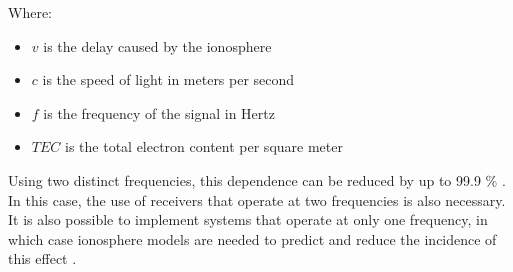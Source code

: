 Where:

\begin{itemize}
    \item $v$ is the delay caused by the ionosphere
    \item $c$ is the speed of light in meters per second
    \item $f$ is the frequency of the signal in Hertz
    \item $TEC$ is the total electron content per square meter
\end{itemize}



Using two distinct frequencies, this dependence can be reduced by up to 99.9 \% \cite{ionospheric-delay-navipedia}. In this case, the use of receivers that operate at two frequencies is also necessary. It is also possible to implement systems that operate at only one frequency, in which case ionosphere models are needed to predict and reduce the incidence of this effect \cite{rao2008}.

